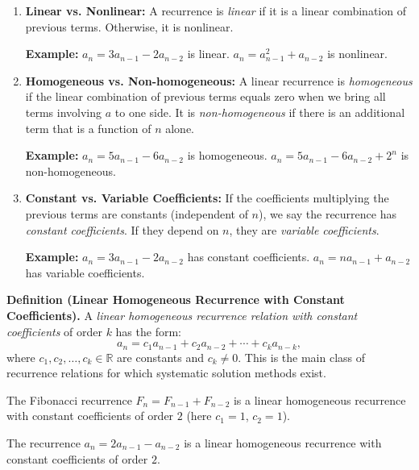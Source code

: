 \documentclass[11pt,a4paper]{article}
\begin{document}
\begin{enumerate}[label=(\arabic*)]
    \item \textbf{Linear vs. Nonlinear:} A recurrence is \textit{linear} if it is a linear combination of previous terms. Otherwise, it is nonlinear.
    
    \textbf{Example:} $a_n = 3a_{n-1} - 2a_{n-2}$ is linear. $a_n = a_{n-1}^2 + a_{n-2}$ is nonlinear.
    
    \item \textbf{Homogeneous vs. Non-homogeneous:} A linear recurrence is \textit{homogeneous} if the linear combination of previous terms equals zero when we bring all terms involving $a$ to one side. It is \textit{non-homogeneous} if there is an additional term that is a function of $n$ alone.
    
    \textbf{Example:} $a_n = 5a_{n-1} - 6a_{n-2}$ is homogeneous.
    $a_n = 5a_{n-1} - 6a_{n-2} + 2^n$ is non-homogeneous.
    
    \item \textbf{Constant vs. Variable Coefficients:} If the coefficients multiplying the previous terms are constants (independent of $n$), we say the recurrence has \textit{constant coefficients}. If they depend on $n$, they are \textit{variable coefficients}.
    
    \textbf{Example:} $a_n = 3a_{n-1} - 2a_{n-2}$ has constant coefficients.
    $a_n = n a_{n-1} + a_{n-2}$ has variable coefficients.
\end{enumerate}

\textbf{Definition (Linear Homogeneous Recurrence with Constant Coefficients).} A \textit{linear homogeneous recurrence relation with constant coefficients} of order $k$ has the form:
\begin{equation*}
    a_n = c_1 a_{n-1} + c_2 a_{n-2} + \cdots + c_k a_{n-k},
\end{equation*}
where $c_1, c_2, \dots, c_k \in \mathbb{R}$ are constants and $c_k \neq 0$. This is the main class of recurrence relations for which systematic solution methods exist.

\begin{example}
The Fibonacci recurrence $F_n = F_{n-1} + F_{n-2}$ is a linear homogeneous recurrence with constant coefficients of order $2$ (here $c_1 = 1$, $c_2 = 1$).
\end{example}

\begin{example}
The recurrence $a_n = 2a_{n-1} - a_{n-2}$ is a linear homogeneous recurrence with constant coefficients of order $2$.
\end{example}
\end{document}
